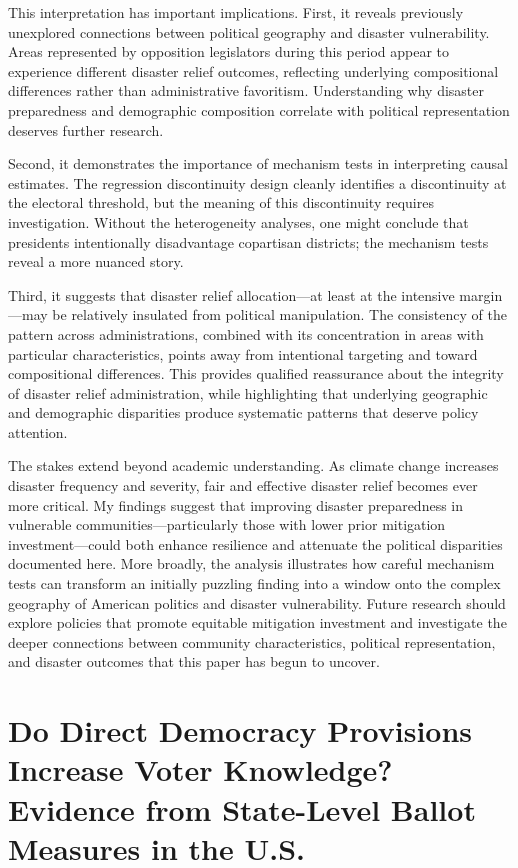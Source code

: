 \documentclass[12pt,letterpaper,oneside]{book}
\newcommand{\mychapter}[1]{
    \chapter{#1}
    \doublespacing
}
\begin{document}
This interpretation has important implications. First, it reveals previously unexplored connections between political geography and disaster vulnerability. Areas represented by opposition legislators during this period appear to experience different disaster relief outcomes, reflecting underlying compositional differences rather than administrative favoritism. Understanding why disaster preparedness and demographic composition correlate with political representation deserves further research.

Second, it demonstrates the importance of mechanism tests in interpreting causal estimates. The regression discontinuity design cleanly identifies a discontinuity at the electoral threshold, but the meaning of this discontinuity requires investigation. Without the heterogeneity analyses, one might conclude that presidents intentionally disadvantage copartisan districts; the mechanism tests reveal a more nuanced story.

Third, it suggests that disaster relief allocation---at least at the intensive margin---may be relatively insulated from political manipulation. The consistency of the pattern across administrations, combined with its concentration in areas with particular characteristics, points away from intentional targeting and toward compositional differences. This provides qualified reassurance about the integrity of disaster relief administration, while highlighting that underlying geographic and demographic disparities produce systematic patterns that deserve policy attention.

The stakes extend beyond academic understanding. As climate change increases disaster frequency and severity, fair and effective disaster relief becomes ever more critical. My findings suggest that improving disaster preparedness in vulnerable communities---particularly those with lower prior mitigation investment---could both enhance resilience and attenuate the political disparities documented here. More broadly, the analysis illustrates how careful mechanism tests can transform an initially puzzling finding into a window onto the complex geography of American politics and disaster vulnerability. Future research should explore policies that promote equitable mitigation investment and investigate the deeper connections between community characteristics, political representation, and disaster outcomes that this paper has begun to uncover.

\mychapter{Do Direct Democracy Provisions Increase Voter Knowledge? Evidence from State-Level Ballot Measures in the U.S.}
\end{document}
